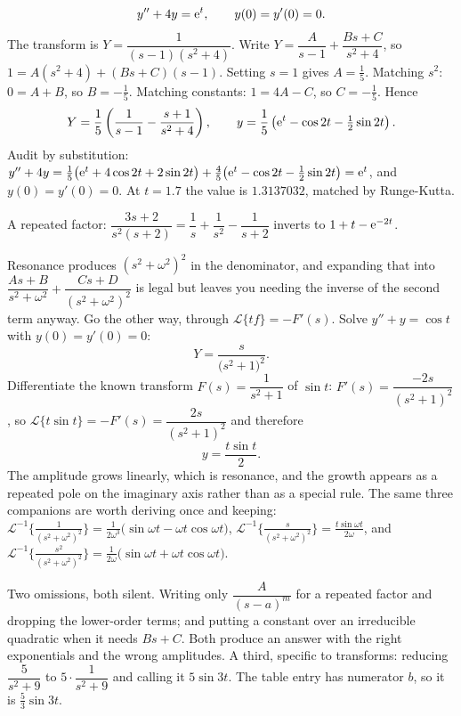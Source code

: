 \begin{worked}
\[y''+4y=\mathrm{e}^{t},\qquad y(0)=y'(0)=0.\]
The transform is $Y=\dfrac{1}{(s-1)(s^{2}+4)}$. Write $Y=\dfrac{A}{s-1}+\dfrac{Bs+C}{s^{2}+4}$, so $1=A(s^{2}+4)+(Bs+C)(s-1)$. Setting $s=1$ gives $A=\tfrac15$. Matching $s^{2}$: $0=A+B$, so $B=-\tfrac15$. Matching constants: $1=4A-C$, so $C=-\tfrac15$. Hence
\[Y=\frac15\left(\frac{1}{s-1}-\frac{s+1}{s^{2}+4}\right),\qquad y=\frac15\left(\mathrm{e}^{t}-\cos2t-\tfrac12\sin2t\right).\]
Audit by substitution: $y''+4y=\tfrac15\bigl(\mathrm{e}^{t}+4\cos2t+2\sin2t\bigr)+\tfrac45\bigl(\mathrm{e}^{t}-\cos2t-\tfrac12\sin2t\bigr)=\mathrm{e}^{t}$, and $y(0)=y'(0)=0$. At $t=1.7$ the value is $1.3137032$, matched by Runge-Kutta.

A repeated factor: $\dfrac{3s+2}{s^{2}(s+2)}=\dfrac1s+\dfrac1{s^{2}}-\dfrac1{s+2}$ inverts to $1+t-\mathrm{e}^{-2t}$.
\end{worked}

\begin{worked}
Resonance produces $(s^{2}+\omega^{2})^{2}$ in the denominator, and expanding that into $\dfrac{As+B}{s^{2}+\omega^{2}}+\dfrac{Cs+D}{(s^{2}+\omega^{2})^{2}}$ is legal but leaves you needing the inverse of the second term anyway. Go the other way, through $\mathcal{L}\{tf\}=-F'(s)$. Solve $y''+y=\cos t$ with $y(0)=y'(0)=0$:
\[Y=\frac{s}{\bigl(s^{2}+1\bigr)^{2}}.\]
Differentiate the known transform $F(s)=\dfrac1{s^{2}+1}$ of $\sin t$: $F'(s)=\dfrac{-2s}{(s^{2}+1)^{2}}$, so $\mathcal{L}\{t\sin t\}=-F'(s)=\dfrac{2s}{(s^{2}+1)^{2}}$ and therefore
\[y=\frac{t\sin t}{2}.\]
The amplitude grows linearly, which is resonance, and the growth appears as a repeated pole on the imaginary axis rather than as a special rule. The same three companions are worth deriving once and keeping: $\mathcal{L}^{-1}\bigl\{\tfrac{1}{(s^{2}+\omega^{2})^{2}}\bigr\}=\tfrac{1}{2\omega^{3}}\bigl(\sin\omega t-\omega t\cos\omega t\bigr)$, $\mathcal{L}^{-1}\bigl\{\tfrac{s}{(s^{2}+\omega^{2})^{2}}\bigr\}=\tfrac{t\sin\omega t}{2\omega}$, and $\mathcal{L}^{-1}\bigl\{\tfrac{s^{2}}{(s^{2}+\omega^{2})^{2}}\bigr\}=\tfrac{1}{2\omega}\bigl(\sin\omega t+\omega t\cos\omega t\bigr)$.
\end{worked}

\begin{trap}
Two omissions, both silent. Writing only $\dfrac{A}{(s-a)^{m}}$ for a repeated factor and dropping the lower-order terms; and putting a constant over an irreducible quadratic when it needs $Bs+C$. Both produce an answer with the right exponentials and the wrong amplitudes. A third, specific to transforms: reducing $\dfrac{5}{s^{2}+9}$ to $5\cdot\dfrac1{s^{2}+9}$ and calling it $5\sin3t$. The table entry has numerator $b$, so it is $\tfrac53\sin3t$.
\end{trap}

